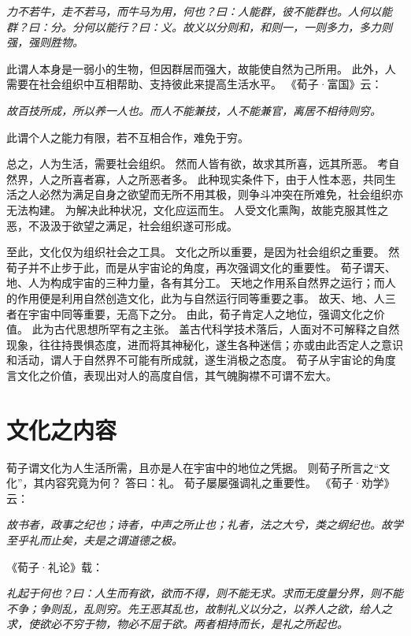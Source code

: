 \documentclass[11pt]{article}
\begin{document}
\textit{力不若牛，走不若马，而牛马为用，何也？曰：人能群，彼不能群也。人何以能群？曰：分。分何以能行？曰：义。故义以分则和，和则一，一则多力，多力则强，强则胜物。}

此谓人本身是一弱小的生物，但因群居而强大，故能使自然为己所用。
此外，人需要在社会组织中互相帮助、支持彼此来提高生活水平。
《荀子·富国》云：

\textit{故百技所成，所以养一人也。而人不能兼技，人不能兼官，离居不相待则穷。}

此谓个人之能力有限，若不互相合作，难免于穷。

\newline

总之，人为生活，需要社会组织。
然而人皆有欲，故求其所喜，远其所恶。
考自然界，人之所喜者寡，人之所恶者多。
此种现实条件下，由于人性本恶，共同生活之人必然为满足自身之欲望而无所不用其极，则争斗冲突在所难免，社会组织亦无法构建。
为解决此种状况，文化应运而生。
人受文化熏陶，故能克服其性之恶，不汲汲于欲望之满足，社会组织遂可形成。

\newline

至此，文化仅为组织社会之工具。
文化之所以重要，是因为社会组织之重要。
然荀子并不止步于此，而是从宇宙论的角度，再次强调文化的重要性。
荀子谓天、地、人为构成宇宙的三种力量，各有其分工。
天地之作用系自然界之运行；而人的作用便是利用自然创造文化，此为与自然运行同等重要之事。
故天、地、人三者在宇宙中同等重要，无高下之分。
由此，荀子肯定人之地位，强调文化之价值。
此为古代思想所罕有之主张。
盖古代科学技术落后，人面对不可解释之自然现象，往往持畏惧态度，进而将其神秘化，遂生各种迷信；亦或由此否定人之意识和活动，谓人于自然界不可能有所成就，遂生消极之态度。
荀子从宇宙论的角度言文化之价值，表现出对人的高度自信，其气魄胸襟不可谓不宏大。

\section{文化之内容}
荀子谓文化为人生活所需，且亦是人在宇宙中的地位之凭据。
则荀子所言之“文化”，其内容究竟为何？
答曰：礼。
荀子屡屡强调礼之重要性。
《荀子·劝学》云：

\textit{故书者，政事之纪也；诗者，中声之所止也；礼者，法之大兮，类之纲纪也。故学至乎礼而止矣，夫是之谓道德之极。}

《荀子·礼论》载：

\textit{礼起于何也？曰：人生而有欲，欲而不得，则不能无求。求而无度量分界，则不能不争；争则乱，乱则穷。先王恶其乱也，故制礼义以分之，以养人之欲，给人之求，使欲必不穷于物，物必不屈于欲。两者相持而长，是礼之所起也。}
\end{document}
